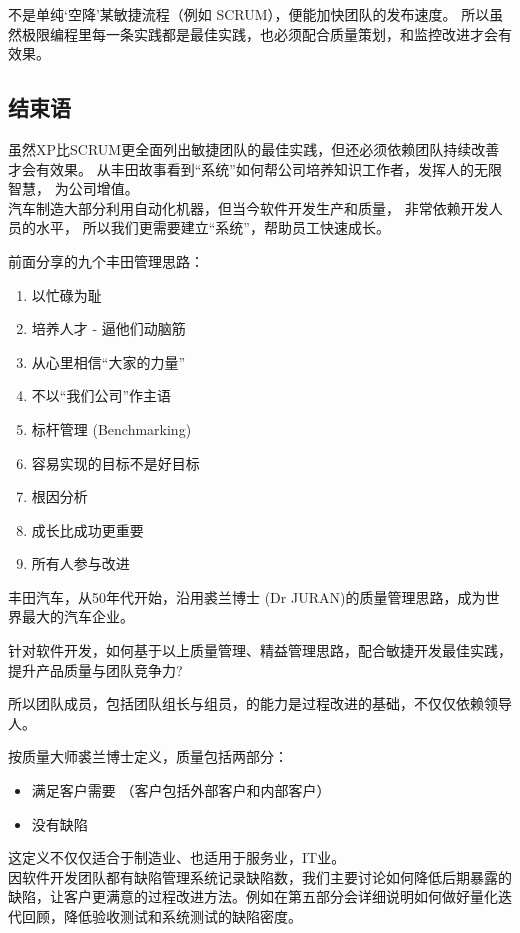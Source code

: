 不是单纯`空降'某敏捷流程（例如 SCRUM），便能加快团队的发布速度。
所以虽然极限编程里每一条实践都是最佳实践，也必须配合质量策划，和监控改进才会有效果。

\hypertarget{ux7ed3ux675fux8bed}{%
\subsection{结束语}\label{ux7ed3ux675fux8bed}}

虽然XP比SCRUM更全面列出敏捷团队的最佳实践，但还必须依赖团队持续改善才会有效果。
从丰田故事看到``系统''如何帮公司培养知识工作者，发挥人的无限智慧，
为公司增值。\\
汽车制造大部分利用自动化机器，但当今软件开发生产和质量，
非常依赖开发人员的水平， 所以我们更需要建立``系统''，帮助员工快速成长。

前面分享的九个丰田管理思路：

\begin{enumerate}
\tightlist
\item
  以忙碌为耻
\item
  培养人才 - 逼他们动脑筋
\item
  从心里相信``大家的力量''
\item
  不以``我们公司''作主语
\item
  标杆管理 (Benchmarking)
\item
  容易实现的目标不是好目标
\item
  根因分析
\item
  成长比成功更重要
\item
  所有人参与改进
\end{enumerate}

丰田汽车，从50年代开始，沿用裘兰博士 (Dr
JURAN)的质量管理思路，成为世界最大的汽车企业。

针对软件开发，如何基于以上质量管理、精益管理思路，配合敏捷开发最佳实践，提升产品质量与团队竞争力?

所以团队成员，包括团队组长与组员，的能力是过程改进的基础，不仅仅依赖领导人。

按质量大师裘兰博士定义，质量包括两部分：

\begin{itemize}
\tightlist
\item
  满足客户需要 （客户包括外部客户和内部客户）
\item
  没有缺陷\\
\end{itemize}

这定义不仅仅适合于制造业、也适用于服务业，IT业。\\
因软件开发团队都有缺陷管理系统记录缺陷数，我们主要讨论如何降低后期暴露的缺陷，让客户更满意的过程改进方法。例如在第五部分会详细说明如何做好量化迭代回顾，降低验收测试和系统测试的缺陷密度。

